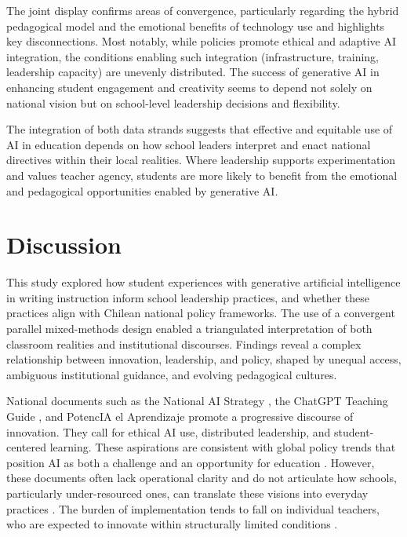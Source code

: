 \documentclass[english]{textolivre}
\begin{document}
The joint display confirms areas of convergence, particularly regarding the hybrid pedagogical model and the emotional benefits of technology use and highlights key disconnections. Most notably, while policies promote ethical and adaptive AI integration, the conditions enabling such integration (infrastructure, training, leadership capacity) are unevenly distributed. The success of generative AI in enhancing student engagement and creativity seems to depend not solely on national vision but on school-level leadership decisions and flexibility.

The integration of both data strands suggests that effective and equitable use of AI in education depends on how school leaders interpret and enact national directives within their local realities. Where leadership supports experimentation and values teacher agency, students are more likely to benefit from the emotional and pedagogical opportunities enabled by generative AI.

\section{Discussion}\label{sec-secoes}
This study explored how student experiences with generative artificial intelligence in writing instruction inform school leadership practices, and whether these practices align with Chilean national policy frameworks. The use of a convergent parallel mixed-methods design \cite{creswell2018designing} enabled a triangulated interpretation of both classroom realities and institutional discourses. Findings reveal a complex relationship between innovation, leadership, and policy, shaped by unequal access, ambiguous institutional guidance, and evolving pedagogical cultures.

National documents such as the National AI Strategy \cite{gobiernochile2024enia}, the ChatGPT Teaching Guide \cite{mineduc2023chatgpt}, and PotencIA el Aprendizaje \cite{mineducchile2025potencia} promote a progressive discourse of innovation. They call for ethical AI use, distributed leadership, and student-centered learning. These aspirations are consistent with global policy trends that position AI as both a challenge and an opportunity for education \cite{unesco2023iaeducacion,zawackirichter2019systematic,azevedo2024aipolicies}. However, these documents often lack operational clarity and do not articulate how schools, particularly under-resourced ones, can translate these visions into everyday practices \cite{filgueiras2024education,knox2023repoliticising}. The burden of implementation tends to fall on individual teachers, who are expected to innovate within structurally limited conditions \cite{bannister2024institutional}.
\end{document}
